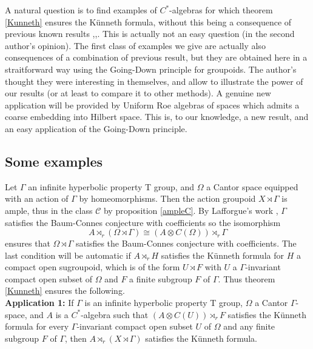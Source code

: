 A natural question is to find examples of $C^*$-algebras for which theorem \ref{Kunneth} ensures the Künneth formula, without this being a consequence of previous known results \cite{RosenbergKunneth},\cite{ChabertEOY},\cite{OY4}. This is actually not an easy question (in the second author's opinion). The first class of examples we give are actually also consequences of a combination of previous result, but they are obtained here in a straitforward way using the Going-Down principle for groupoids. The author's thought they were interesting in themselves, and allow to illustrate the power of our results (or at least to compare it to other methods). A genuine new application will be provided by Uniform Roe algebras of spaces which admits a coarse embedding into Hilbert space. This is, to our knowledge, a new result, and an easy application of the Going-Down principle.\\ %

\subsection{Some examples}

Let $\Gamma$ an infinite hyperbolic property T group, and $\Omega$ a Cantor space equipped with an action of $\Gamma$ by homeomorphisms. Then the action groupoid $X\rtimes \Gamma$ is ample, thus in the class $\mathcal C$ by proposition \ref{ampleC}. By Lafforgue's work \cite{lafforgue2012conjecture}, $\Gamma$ satisfies the Baum-Connes conjecture with coefficients so the isomorphism \[A\rtimes_r (\Omega\rtimes \Gamma) \cong (A\otimes C(\Omega))\rtimes_r \Gamma \]
ensures that $\Omega\rtimes \Gamma$ satisfies the Baum-Connes conjecture with coefficients. The last condition will be automatic if $A\rtimes_r H$ satisfies the Künneth formula for $H$ a compact open sugroupoid, which is of the form $U\rtimes F $ with $U $ a $\Gamma$-invariant compact open subset of $\Omega$ and $F$ a finite subgroup $F$ of $\Gamma$. Thus theorem \ref{Kunneth} ensures the following.\\

\textbf{Application 1: } If $\Gamma$ is an infinite hyperbolic property T group, $\Omega$ a Cantor $\Gamma$-space, and $A$ is a $C^*$-algebra such that $(A\otimes C(U))\rtimes_r F$ satisfies the Künneth formula for every $\Gamma$-invariant compact open subset $U$ of $\Omega$ and any finite subgroup $F$ of $\Gamma$, then $A \rtimes_r (X\rtimes \Gamma)$ satisfies the Künneth formula. \\ 

